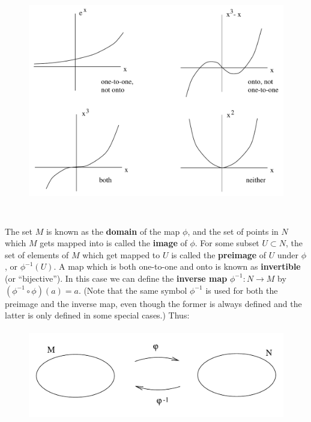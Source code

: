 \documentclass[12pt]{article}
\begin{document}
\begin{figure}
  \centerline{
  \includegraphics[height=10cm]{pdf/two6}}
\end{figure}

The set $M$ is known as the {\bf domain}
of the map $\phi$, and the set of points in $N$ which $M$ gets mapped into
is called the {\bf image} of $\phi$.  For some subset $U\subset N$,
the set of elements of $M$ which get mapped to $U$ is called the
{\bf preimage} of $U$ under $\phi$, or $\phi^{-1}(U)$.  A map which
is both one-to-one and onto is known as {\bf invertible} (or 
``bijective'').  In this case we can define the {\bf inverse map}
$\phi^{-1}:N\rightarrow M$ by $(\phi^{-1}\circ\phi)(a)=a$.  (Note that
the same symbol $\phi^{-1}$ is used for both the preimage and the inverse
map, even though the former is always defined and the latter is
only defined in some special cases.)  Thus:

\begin{figure}[h]
  \centerline{
  \includegraphics[height=4cm]{pdf/two7}}
\end{figure}
\end{document}
